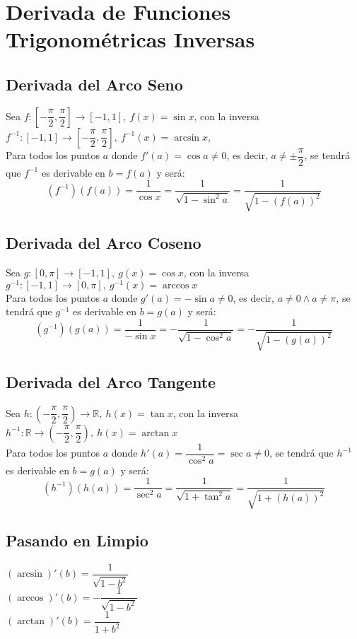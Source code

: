 \documentclass[11pt,a4paper]{article}
\begin{document}
\section{Derivada de Funciones Trigonom\'etricas Inversas}
\subsection{Derivada del Arco Seno}
Sea $f:[-\dfrac{\pi}{2}, \dfrac{\pi}{2}] \rightarrow [-1,1],\ f(x)=\sin x$, con la inversa $f^{-1}:[-1,1] \rightarrow [-\dfrac{\pi}{2}, \dfrac{\pi}{2}],\ f^{-1}(x) = \arcsin x$,\\
Para todos los puntos $a$ donde $f'(a) = \cos a\not=0$, es decir, $a\not=\pm\dfrac{\pi}{2}$, se tendr\'a que $f^{-1}$ es derivable en $b=f(a)$ y ser\'a: $$(f^{-1})(f(a)) = \dfrac{1}{\cos x} = \dfrac{1}{\sqrt{1 - \sin^2 a}} = \dfrac{1}{\sqrt{1-(f(a))^2}} $$

\subsection{Derivada del Arco Coseno}
Sea $g:[0,\pi]\rightarrow[-1,1],\ g(x)=\cos x$, con la inversa $g^{-1}:[-1,1]\rightarrow[0,\pi],\ g^{-1}(x)=\arccos x$\\
Para todos los puntos $a$ donde $g'(a) = -\sin a\not=0$, es decir, $a\not=0 \land a\not=\pi$, se tendr\'a que $g^{-1}$ es derivable en $b=g(a)$ y ser\'a: $$(g^{-1})(g(a)) = \dfrac{1}{-\sin x} = -\dfrac{1}{\sqrt{1 - \cos^2 a}} = -\dfrac{1}{\sqrt{1-(g(a))^2}} $$

\subsection{Derivada del Arco Tangente}
Sea $h: (-\dfrac{\pi}{2},\dfrac{\pi}{2})\rightarrow\mathbb{R},\ h(x)=\tan x$, con la inversa $h^{-1}:\mathbb{R}\rightarrow(-\dfrac{\pi}{2},\dfrac{\pi}{2}),\ h(x)=\arctan x$\\
Para todos los puntos $a$ donde $h'(a) = \dfrac{1}{\cos^2a}=\sec a\not=0$, se tendr\'a que $h^{-1}$ es derivable en $b=g(a)$ y ser\'a: $$(h^{-1})(h(a)) = \dfrac{1}{\sec^2 a} = \dfrac{1}{\sqrt{1 + \tan^2 a}} = \dfrac{1}{\sqrt{1 + (h(a))^2}} $$

\subsection{Pasando en Limpio}
\begin{multicols}{3}
$(\arcsin)'(b) = \dfrac{1}{\sqrt{1 - b^2}}$\\
$(\arccos)'(b) = -\dfrac{1}{\sqrt{1 - b^2}}$\\
$(\arctan)'(b) = \dfrac{1}{1 + b^2}$\\
\end{multicols}
\end{document}
